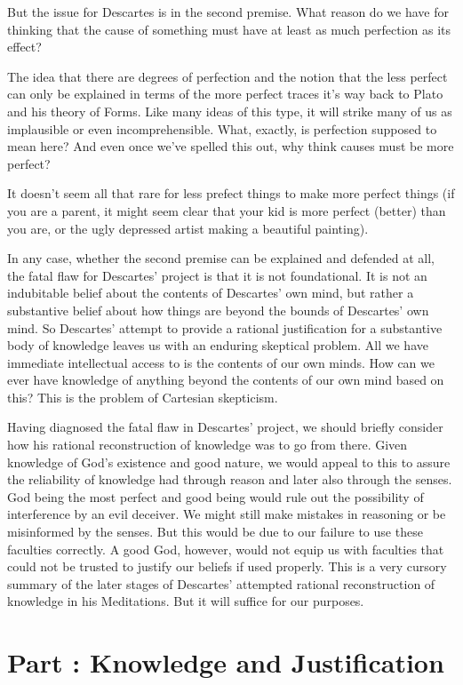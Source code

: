 But the issue for Descartes is in the second premise. What reason do we have for thinking that the cause of something must have at least as much perfection as its effect?

The idea that there are degrees of perfection and the notion that the less perfect can only be explained in terms of the more perfect traces it's way back to Plato and his theory of Forms. Like many ideas of this type, it will strike many of us as implausible or even incomprehensible. What, exactly, is perfection supposed to mean here?  And even once we’ve spelled this out, why think causes must be more perfect?

It doesn't seem all that rare for less prefect things to make more perfect things (if you are a parent, it might seem clear that your kid is more perfect (better) than you are, or the ugly depressed artist making a beautiful painting).

In any case, whether the second premise can be explained and defended at all, the fatal flaw for Descartes’ project is that it is not foundational. It is not an indubitable belief about the contents of Descartes’ own mind, but rather a substantive belief about how things are beyond the bounds of Descartes’ own mind. So Descartes’ attempt to provide a rational justification for a substantive body of knowledge leaves us with an enduring skeptical problem. All we have immediate intellectual access to is the contents of our own minds. How can we ever have knowledge of anything beyond the contents of our own mind based on this? This is the problem of Cartesian skepticism.

Having diagnosed the fatal flaw in Descartes’ project, we should briefly consider how his rational reconstruction of knowledge was to go from there. Given knowledge of God’s existence and good nature, we would appeal to this to assure the reliability of knowledge had through reason and later also through the senses. God being the most perfect and good being would rule out the possibility of interference by an evil deceiver. We might still make mistakes in reasoning or be misinformed by the senses. But this would be due to our failure to use these faculties correctly. A good God, however, would not equip us with faculties that could not be trusted to justify our beliefs if used properly. This is a very cursory summary of the later stages of Descartes’ attempted rational reconstruction of knowledge in his Meditations. But it will suffice for our purposes.
\chapter{Part \thechapcount: Knowledge and Justification}\setcounter{seccount}{1}

